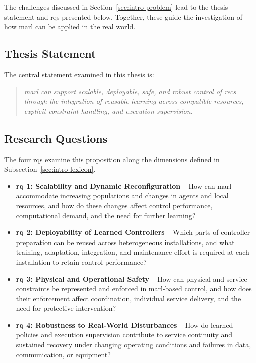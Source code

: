 The challenges discussed in Section~\ref{sec:intro-problem} lead to the thesis statement and \glspl{rq} presented below. Together, these guide the investigation of how \gls{marl} can be applied in the real world.

\subsection{Thesis Statement}
\label{sec:intro-statement}

The central statement examined in this thesis is:

\begin{quote}
\emph{\gls{marl} can support scalable, deployable, safe, and robust control of \glspl{rec} through the integration of reusable learning across compatible resources, explicit constraint handling, and execution supervision.}
\end{quote}

\subsection{Research Questions}
\label{sec:intro-questions}

The four \glspl{rq} examine this proposition along the dimensions defined in Subsection~\ref{sec:intro-lexicon}.

\begin{itemize}[leftmargin=1.5em,itemsep=0.65\baselineskip,parsep=0pt,topsep=0.5\baselineskip]
\item \textbf{\gls{rq} 1: Scalability and Dynamic Reconfiguration} -- How can \gls{marl} accommodate increasing populations and changes in agents and local resources, and how do these changes affect control performance, computational demand, and the need for further learning?

\item \textbf{\gls{rq} 2: Deployability of Learned Controllers} -- Which parts of controller preparation can be reused across heterogeneous installations, and what training, adaptation, integration, and maintenance effort is required at each installation to retain control performance?

\item \textbf{\gls{rq} 3: Physical and Operational Safety} -- How can physical and service constraints be represented and enforced in \gls{marl}-based control, and how does their enforcement affect coordination, individual service delivery, and the need for protective intervention?

\item \textbf{\gls{rq} 4: Robustness to Real-World Disturbances} -- How do learned policies and execution supervision contribute to service continuity and sustained recovery under changing operating conditions and failures in data, communication, or equipment?
\end{itemize}

